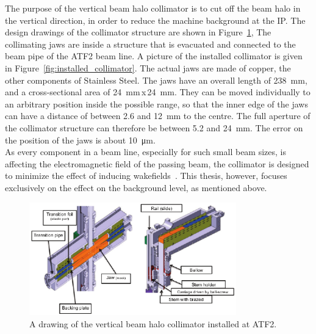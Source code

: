 The purpose of the vertical beam halo collimator is to cut off the beam halo in the vertical direction, in order to reduce the machine background at the IP.
The design drawings of the collimator structure are shown in Figure~\ref{fig:collimator},
The collimating jaws are inside a structure that is evacuated and connected to the beam pipe of the ATF2 beam line. 
A picture of the installed collimator is given in Figure~\ref{fig:installed_collimator}.
The actual jaws are made of copper, the other components of Stainless Steel. 
The jaws have an overall length of \SI{238}{\milli\meter}, and a cross-sectional area of \mbox{\SI{24}{\milli\meter}\,x\,\SI{24}{\milli\meter}}.
They can be moved individually to an arbitrary position inside the possible range, so that the inner edge of the jaws can have a distance of between 2.6 and \SI{12}{\milli\metre} to the centre. 
The full aperture of the collimator structure can therefore be between 5.2 and \SI{24}{\milli\metre}. 
The error on the position of the jaws is about \SI{10}{\micro\metre}.\\
As every component in a beam line, especially for such small beam sizes, is affecting the electromagnetic field of the passing beam, the collimator is designed to minimize the effect of inducing wakefields~\cite{NuriaCollimator2015,Nuria_Thesis}. 
This thesis, however, focuses exclusively on the effect on the background level, as mentioned above.
\begin{figure}
\centering
\includegraphics[width=0.8\textwidth]{Figures/ATF/ATF2_beamhalo_collimator.pdf}
\caption[Drawing of the beam halo collimator]{A drawing of the vertical beam halo collimator installed at ATF2.~\cite{NuriaCollimator2015}}
\label{fig:collimator}
\end{figure}
